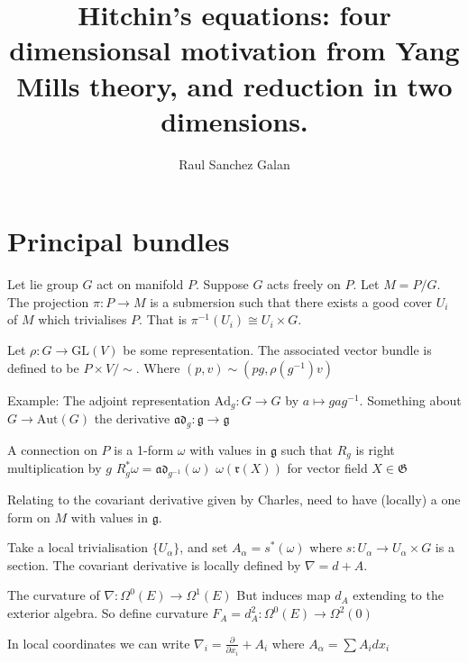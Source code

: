 % 

\title{Hitchin's equations: four dimensionsal motivation from Yang Mills theory, and reduction in two dimensions.}
\author{Raul Sanchez Galan}
\date{}

 
\maketitle

\section{Principal bundles} %
Let lie group $G$ act on manifold $P$.
Suppose $G$ acts freely on $P$. 
Let $M = P/G $. 
The projection $ \pi: P \rightarrow M $ is a submersion such that there exists a good cover $U_i $ of $M$ which trivialises $P$. 
That is $ \pi^{-1} ( U_i ) \cong U_i \times G $. 

Let $ \rho : G \rightarrow \mathrm{GL} ( V) $ be some representation. 
The associated vector bundle is defined to be $P \times V / \sim$. 
Where $ (p,v) \sim ( pg, \rho(g^{-1}) v ) $

Example: 
The adjoint representation 
$ \mathrm{Ad}_g : G \rightarrow  G $ by $ a \mapsto gag^{-1} $. 
Something about $ G \rightarrow  \mathrm{Aut}(G) $ 
the derivative $ \mathfrak{ad}_g : \mathfrak{g} \rightarrow  \mathfrak{g} $ 

A connection on $ P$ is a 1-form $\omega$ with values in $ \mathfrak{g} $ such that
$R_g$ is right multiplication by $ g$ 
$ R_g ^* \omega = \mathfrak{ad} _{g^{-1}} (\omega)$
$ \omega(\mathfrak{r} (X)) $ for vector field $X \in \mathfrak{G} $

Relating to the covariant derivative given by Charles, need to have (locally) a one form on $M$ with values in $ \mathfrak{g} $. 

Take a local trivialisation $ \{U_\alpha \} $, 
and set $ A_\alpha = s^* (\omega) $ 
where $ s: U_\alpha \rightarrow U_\alpha \times G $ is a section. 
The covariant derivative is locally defined by $ \nabla = d + A $.

The curvature of $ \nabla : \Omega^0 ( E) \rightarrow  \Omega^1 ( E) $
But induces map $d_A$ extending to the exterior algebra. 
So define curvature $F_A = d_A ^2 : \Omega^0 ( E ) \rightarrow \Omega^2(0)$ 

In local coordinates we can write 
$\nabla _i = \frac{\partial}{\partial x_i } + A_i $ where 
$ A_\alpha = \sum A_i dx_i $


